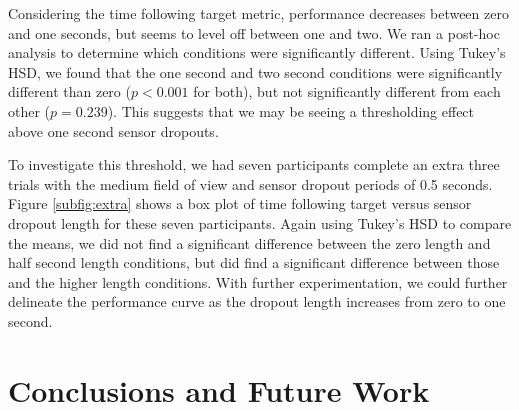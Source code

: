 \documentclass{acmsiggraph}                     %
\begin{document}
Considering the time following target metric, performance decreases between zero and one seconds, but seems to level off between one and two.  We ran a post-hoc analysis to determine which conditions were significantly different.  Using Tukey's HSD, we found that the one second and two second conditions were significantly different than zero ($p<0.001$ for both), but not significantly different from each other ($p=0.239$).  This suggests that we may be seeing a thresholding effect above one second sensor dropouts.


To investigate this threshold, we had seven participants complete an extra three trials with the medium field of view and sensor dropout periods of 0.5 seconds.  Figure \ref{subfig:extra} shows a box plot of time following target versus sensor dropout length for these seven participants.  Again using Tukey's HSD to compare the means, we did not find a significant difference between the zero length and half second length conditions, but did find a significant difference between those and the higher length conditions.
With further experimentation, we could further delineate the performance curve as the dropout length increases from zero to one second.


\section{Conclusions and Future Work}
\end{document}
